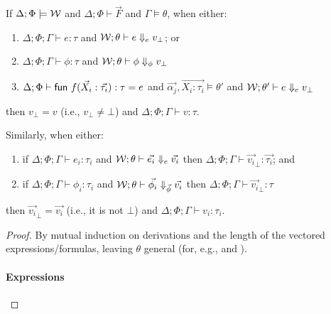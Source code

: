 \documentclass[acmsmall,screen,nonacm]{acmart}
\theoremstyle{definition}
\begin{document}
\begin{lemma}
\label{lem:typesafe-term-formula}
  If $\Delta; \Phi \models \mathcal{W}$ and $\Delta; \Phi \vdash \vec{F}$
  and $\Gamma \models \theta$, when either:
%
  \begin{enumerate}

  \item\label{typesafety:e} $\Delta; \Phi; \Gamma \vdash e : \tau$ and
  $\mathcal{W}; \theta \vdash e \Downarrow_e v_\bot$; or

  \item\label{typesafety:phi} $\Delta; \Phi; \Gamma \vdash \phi
  : \tau$ and $\mathcal{W}; \theta \vdash \phi \Downarrow_\phi v_\bot$

  \item\label{typesafety:F} $\Delta; \Phi \vdash \mathsf{fun } ~ {f}({\vec{X_i}
  : \vec{\tau_i}}) : {\tau} = {e}$ and $\vec{\alpha_j}, \overrightarrow{X_i
  : \tau_i} \models \theta'$ and $\mathcal{W}; \theta' \vdash e \Downarrow_e
  v_\bot$

  \end{enumerate}
%
then $v_\bot = v$ (i.e., $v_\bot \ne \bot$) and
$\Delta; \Phi; \Gamma \vdash v : \tau$.

Similarly, when either:

\begin{enumerate}
  \item\label{typesafety:vece} if $\Delta; \Phi; \Gamma \vdash e_i
  : \tau_i$ and $\mathcal{W}; \theta \vdash \vec{e_i} \Downarrow_e \vec{v_i}$
  then $\Delta; \Phi; \Gamma \vdash \vec{v_i}_\bot : \vec{\tau_i}$; and

  \item\label{typesafety:vecphi} if
  $\Delta; \Phi; \Gamma \vdash \phi_i : \tau_i$ and
  $\mathcal{W}; \theta \vdash \vec{\phi_i} \Downarrow_{\vec{\phi}} \vec{v_i}$ then
  $\Delta; \Phi; \Gamma \vdash \vec{v_i}_\bot : \tau$
\end{enumerate}
%
then $\vec{v_i}_\bot = \vec{v_i}$ (i.e., it is not $\bot$) and
$\Delta; \Phi; \Gamma \vdash v_i : \tau_i$.
%
\begin{proof}
  By mutual induction on derivations and the length of the vectored
  expressions/formulas, leaving $\theta$ general (for,
  e.g.,  and ).

  \paragraph*{Expressions}

\begin{proofcases}


\end{proofcases}
\end{proof}
\end{lemma}
\end{document}
